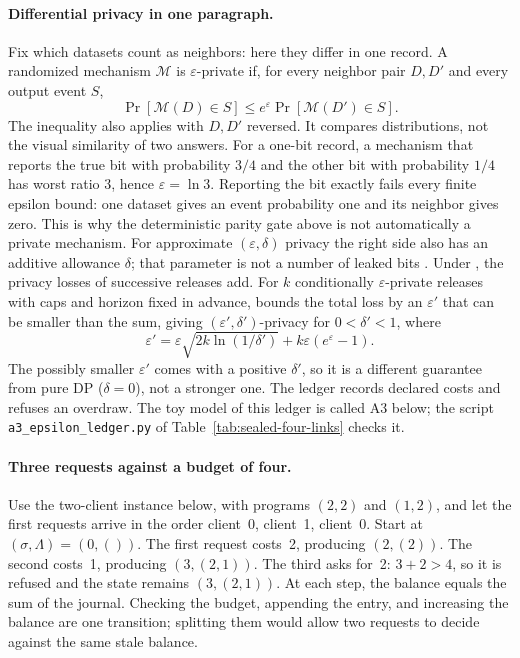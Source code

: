 \documentclass[11pt,a4paper]{article}
\theoremstyle{definition}
\begin{document}
\paragraph{Differential privacy in one paragraph.}
Fix which datasets count as neighbors: here they differ in one record. A randomized mechanism $\mathcal{M}$ is $\varepsilon$-private if, for every
neighbor pair $D,D'$ and every output event $S$,
\[
\Pr[\mathcal{M}(D)\in S]\le e^\varepsilon\Pr[\mathcal{M}(D')\in S].
\]
The inequality also applies with $D,D'$ reversed. It compares distributions,
not the visual similarity of two answers. For a one-bit record, a mechanism
that reports the true bit with probability $3/4$ and the other bit with
probability $1/4$ has worst ratio $3$, hence $\varepsilon=\ln3$. Reporting the
bit exactly fails every finite epsilon bound: one dataset gives an event
probability one and its neighbor gives zero. This is why the deterministic
parity gate above is not automatically a private mechanism.
For approximate $(\varepsilon,\delta)$ privacy the right side also has an
additive allowance $\delta$; that parameter is not a number of leaked bits
.
Under , the privacy losses of successive releases
add. For $k$ conditionally
$\varepsilon$-private releases with caps and horizon fixed in advance,
 bounds the total loss by an $\varepsilon'$ that
can be smaller than the sum, giving $(\varepsilon',\delta')$-privacy for
$0<\delta'<1$, where
\[
\varepsilon'=\varepsilon\sqrt{2k\ln(1/\delta')}+k\varepsilon(e^{\varepsilon}-1).
\]
The possibly smaller $\varepsilon'$
comes with a positive $\delta'$, so it is a different guarantee from pure DP
($\delta=0$), not a stronger one. The ledger records declared costs and
refuses an overdraw. The toy model of this ledger is called A3 below; the
script \texttt{a3\_epsilon\_ledger.py} of Table~\ref{tab:sealed-four-links}
checks it.

\paragraph{Three requests against a budget of four.}
Use the two-client instance below, with programs $(2,2)$ and $(1,2)$, and let
the first requests arrive in the order client~0, client~1, client~0.
Start at $(\sigma,\Lambda)=(0,())$. The first request costs~2, producing
$(2,(2))$. The second costs~1, producing $(3,(2,1))$. The third asks for~2:
$3+2>4$, so it is refused and the state remains $(3,(2,1))$.
At each step, the balance equals the sum of the journal. Checking the budget,
appending the entry, and increasing the balance are one transition; splitting
them would allow two requests to decide against the same stale balance.
\end{document}
